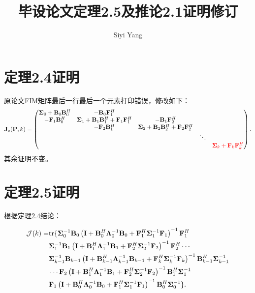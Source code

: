 \documentclass[a4paper,11pt]{article}
\newcommand\V[1]{\mathrm{\bf{#1}}}
\newcommand\Tx[1]{\mathrm{#1}}
\newcommand\Se[1]{\mathcal{#1}}
\newcommand\SB[1]{\left(#1\right)}
\begin{document}
\title{毕设论文定理2.5及推论2.1证明修订}
\author{Siyi Yang}
\maketitle

\section{定理2.4证明}

原论文FIM矩阵最后一行最后一个元素打印错误，修改如下：
\begin{equation}
\begin{split}
\V{J}_{\Tx{e}}(\V{P},k)=
\begin{pmatrix}
\bm{\Sigma}_{0}+\V{B}_{0}\V{B}^H_{0} & -\V{B}_{0}\V{F}^H_{1} & & & \\
 -\V{F}_{1}\V{B}^H_{0}  &  \bm{\Sigma}_{1}+\V{B}_{1}\V{B}^H_{1}+\V{F}_{1}\V{F}^H_{1} & -\V{B}_{1}\V{F}^H_{2} & &\\
 & -\V{F}_{2}\V{B}^H_{1}  &  \bm{\Sigma}_{2}+\V{B}_{2}\V{B}^H_{2}+\V{F}_{2}\V{F}^H_{2} & &\\
 &&&\ddots&\\
 &&&& \textcolor{red}{\bm{\Sigma}_{k}+\V{F}_{k}\V{F}^H_{k}}
\end{pmatrix}.
\end{split}
\end{equation}
其余证明不变。

\section{定理2.5证明}
根据定理2.4结论：

\begin{equation}
\begin{split}
\Se{J}(k)=&\Tx{tr}\{\bm{\Sigma}_{0}^{-1}\V{B}_{0}\SB{\V{I}+\V{B}_{0}^H\bm{\Lambda}_0^{-1}\V{B}_{0}+\V{F}_{1}^H\bm{\Sigma}_{1}^{-1}\V{F}_{1}}^{-1}\V{F}_{1}^H\\
&\bm{\Sigma}_{1}^{-1}\V{B}_{1}\SB{\V{I}+\V{B}_{1}^H\bm{\Lambda}_{1}^{-1}\V{B}_{1}+\V{F}_{2}^H\bm{\Sigma}_{2}^{-1}\V{F}_{2}}^{-1}\V{F}_{2}^H\cdots\\
&\bm{\Sigma}_{k-1}^{-1}\V{B}_{k-1}\SB{\V{I}+\V{B}_{k-1}^H\bm{\Lambda}_{k-1}^{-1}\V{B}_{k-1}+\V{F}_{k}^H\bm{\Sigma}_{k}^{-1}\V{F}_{k}}^{-1}\V{B}_{k-1}^H\bm{\Sigma}_{k-1}^{-1}\\
&\cdots \V{F}_{2}\SB{\V{I}+\V{B}_{1}^H\bm{\Lambda}_{1}^{-1}\V{B}_{1}+\V{F}_{2}^H\bm{\Sigma}_{2}^{-1}\V{F}_{2}}^{-1}\V{B}_{1}^H\bm{\Sigma}_{1}^{-1}\\
&\V{F}_{1}\SB{\V{I}+\V{B}_{0}^H\bm{\Lambda}_0^{-1}\V{B}_{0}+\V{F}_{1}^H\bm{\Sigma}_{1}^{-1}\V{F}_{1}}^{-1}\V{B}_{0}^H\bm{\Sigma}_{0}^{-1}\}.
\end{split}
\label{Jek}
\end{equation}
\end{document}
